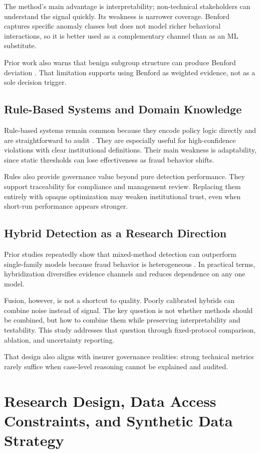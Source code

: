 \documentclass[12pt,a4paper]{report}
\begin{document}
The method's main advantage is interpretability; non-technical stakeholders can understand the signal quickly. Its weakness is narrower coverage. Benford captures specific anomaly classes but does not model richer behavioral interactions, so it is better used as a complementary channel than as an ML substitute.

Prior work also warns that benign subgroup structure can produce Benford deviation \citep{durtschi2004}. That limitation supports using Benford as weighted evidence, not as a sole decision trigger.

\section{Rule-Based Systems and Domain Knowledge}
Rule-based systems remain common because they encode policy logic directly and are straightforward to audit \citep{subelj2011}. They are especially useful for high-confidence violations with clear institutional definitions. Their main weakness is adaptability, since static thresholds can lose effectiveness as fraud behavior shifts.

Rules also provide governance value beyond pure detection performance. They support traceability for compliance and management review. Replacing them entirely with opaque optimization may weaken institutional trust, even when short-run performance appears stronger.

\section{Hybrid Detection as a Research Direction}
Prior studies repeatedly show that mixed-method detection can outperform single-family models because fraud behavior is heterogeneous \citep{phua2010,yue2007}. In practical terms, hybridization diversifies evidence channels and reduces dependence on any one model.

Fusion, however, is not a shortcut to quality. Poorly calibrated hybrids can combine noise instead of signal. The key question is not whether methods should be combined, but how to combine them while preserving interpretability and testability. This study addresses that question through fixed-protocol comparison, ablation, and uncertainty reporting.

That design also aligns with insurer governance realities: strong technical metrics rarely suffice when case-level reasoning cannot be explained and audited.

\chapter{Research Design, Data Access Constraints, and Synthetic Data Strategy}
\end{document}

